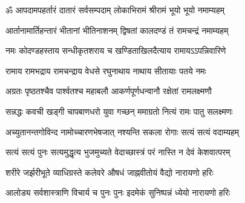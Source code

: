 
\twolineshloka
{ॐ आपदामपहर्तारं दातारं सर्वसम्पदाम्}
{लोकाभिरामं श्रीरामं भूयो भूयो नमाम्यहम्}

\twolineshloka
{आर्तानामार्तिहन्तारं भीतानां भीतिनाशनम्}
{द्विषतां कालदण्डं तं रामचन्द्रं नमाम्यहम्}

\twolineshloka
{नमः कोदण्डहस्ताय सन्धीकृतशराय च}
{खण्डिताखिलदैत्याय रामायऽऽपन्निवारिणे}

\twolineshloka
{रामाय रामभद्राय रामचन्द्राय वेधसे}
{रघुनाथाय नाथाय सीतायाः पतये नमः}

\twolineshloka
{अग्रतः पृष्ठतश्चैव पार्श्वतश्च महाबलौ}
{आकर्णपूर्णधन्वानौ रक्षेतां रामलक्ष्मणौ}

\twolineshloka
{सन्नद्धः कवची खड्गी चापबाणधरो युवा}
{गच्छन् ममाग्रतो नित्यं रामः पातु सलक्ष्मणः}

\twolineshloka
{अच्युतानन्तगोविन्द नामोच्चारणभेषजात्}
{नश्यन्ति सकला रोगाः सत्यं सत्यं वदाम्यहम्}

\twolineshloka
{सत्यं सत्यं पुनः सत्यमुद्धृत्य भुजमुच्यते}
{वेदाच्छास्त्रं परं नास्ति न देवं केशवात्परम्}

\twolineshloka
{शरीरे जर्झरीभूते व्याधिग्रस्ते कलेवरे}
{औषधं जाह्नवीतोयं वैद्यो नारायणो हरिः}

\twolineshloka
{आलोड्य सर्वशास्त्राणि विचार्य च पुनः पुनः}
{इदमेकं सुनिष्पन्नं ध्येयो नारायणो हरिः}
